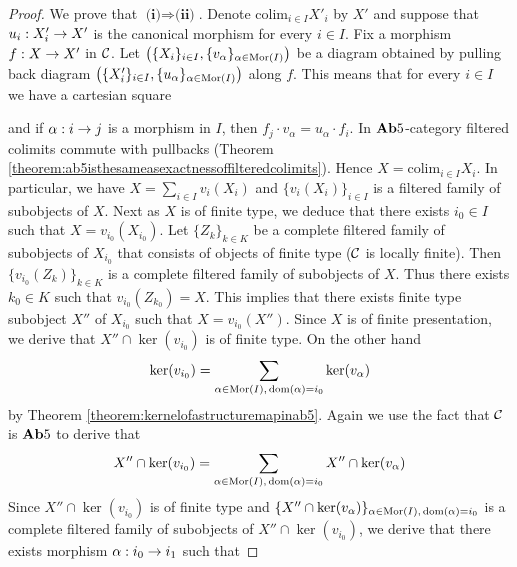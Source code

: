 \begin{proof}
We prove that $\textbf{(i)}\Rightarrow \textbf{(ii)}$. Denote $\mathrm{colim}_{i\in I}X'_i$ by $X'$ and suppose that $u_i:X'_i\rightarrow X'$ is the canonical morphism for every $i\in I$. Fix a morphism $f:X\rightarrow X'$ in ${\mathcal C}$. Let $\left(\{X_i\}_{i\in I},\{v_{\alpha}\}_{\alpha \in \mathrm{Mor}(I)}\right)$ be a diagram obtained by pulling back diagram $\left(\{X'_i\}_{i\in I},\{u_{\alpha}\}_{\alpha \in \mathrm{Mor}(I)}\right)$ along $f$. This means that for every $i\in I$ we have a cartesian square
\begin{center}
\end{center}
and if $\alpha:i\rightarrow j$ is a morphism in $I$, then $f_j\cdot v_{\alpha} = u_{\alpha}\cdot f_i$. In $\mathbf{Ab}5$-category filtered colimits commute with pullbacks (Theorem \ref{theorem:ab5isthesameasexactnessoffilteredcolimits}). Hence $X = \mathrm{colim}_{i\in I}X_i$.  In particular, we have $X = \sum_{i\in I}v_i(X_i)$ and $\{v_i(X_i)\}_{i\in I}$ is a filtered family of subobjects of $X$. Next as $X$ is of finite type, we deduce that there exists $i_0\in I$ such that $X = v_{i_0}(X_{i_0})$. Let $\{Z_k\}_{k\in K}$ be a complete filtered family of subobjects of $X_{i_0}$ that consists of objects of finite type (${\mathcal C}$ is locally finite). Then $\{v_{i_0}(Z_k)\}_{k\in K}$ is a complete filtered family of subobjects of $X$. Thus there exists $k_0\in K$ such that $v_{i_0}(Z_{k_0})=X$. This implies that there exists finite type subobject $X''$ of $X_{i_0}$ such that $X= v_{i_0}(X'')$. Since $X$ is of finite presentation, we derive that $X''\cap \ker(v_{i_0})$ is of finite type. On the other hand
$$\ker(v_{i_0}) = \sum_{\alpha \in \mathrm{Mor}(I),\,\mathrm{dom}(\alpha)=i_0}\ker(v_{\alpha})$$
by Theorem \ref{theorem:kernelofastructuremapinab5}. Again we use the fact that ${\mathcal C}$ is $\mathbf{Ab}5$ to derive that
$$X''\cap \ker(v_{i_0}) = \sum_{\alpha \in \mathrm{Mor}(I),\,\mathrm{dom}(\alpha)=i_0}X''\cap \ker(v_{\alpha})$$
Since $X''\cap \ker(v_{i_0})$ is of finite type and $\{X''\cap \ker(v_{\alpha})\}_{\alpha \in \mathrm{Mor}(I),\,\mathrm{dom}(\alpha)=i_0}$ is a complete filtered family of subobjects of $X''\cap \ker(v_{i_0})$, we derive that there exists morphism $\alpha:i_0\rightarrow i_1$ such that 

\end{proof}
